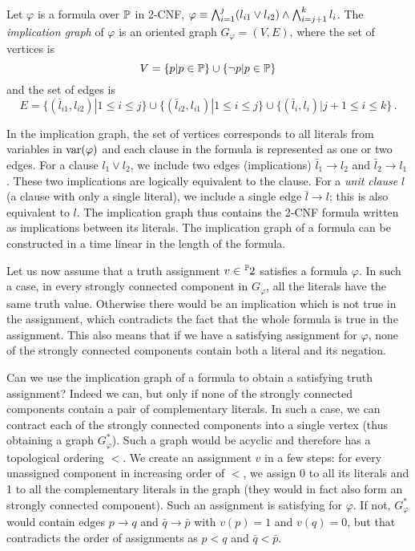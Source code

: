 \begin{definition}
Let $\varphi$ is a formula over $\mathbb{P}$ in 2-CNF, $\varphi \equiv \bigwedge_{i=1}^j (l_{i1} \lor l_{i2}) \land \bigwedge_{i=j+1}^k l_{i}$. The \emph{implication graph} of $\varphi$ is an oriented graph $G_\varphi = (V, E)$, where the set of vertices is $$V = \{p | p \in \mathbb{P}\} \cup \{\neg p | p \in \mathbb{P}\}$$ and the set of edges is $$E = \{(\bar{l}_{i1}, l_{i2}) | 1 \leq i \leq j\} \cup \{(\bar{l}_{i2}, l_{i1}) | 1 \leq i \leq j \} \cup \{(\bar{l}_i, l_i) | j + 1 \leq i \leq k\}\,.$$
\end{definition}

In the implication graph, the set of vertices corresponds to all literals from variables in $\operatorname{var}(\varphi)$ and each clause in the formula is represented as one or two edges. For a clause $l_1 \lor l_2$, we include two edges (implications) $\bar{l}_1 \to l_2$ and $\bar{l}_2 \to l_1$. These two implications are logically equivalent to the clause. For a \emph{unit clause} $l$ (a clause with only a single literal), we include a single edge $\bar{l} \to l$; this is also equivalent to $l$. The implication graph thus contains the 2-CNF formula written as implications between its literals. The implication graph of a formula can be constructed in a time linear in the length of the formula.

Let us now assume that a truth assignment $v \in \fset{\Prop}{2}$ satisfies a formula $\varphi$. In such a case, in every strongly connected component in $G_\varphi$, all the literals have the same truth value. Otherwise there would be an implication which is not true in the assignment, which contradicts the fact that the whole formula is true in the assignment. This also means that if we have a satisfying assignment for $\varphi$, none of the strongly connected components contain both a literal and its negation. 

Can we use the implication graph of a formula to obtain a satisfying truth assignment? Indeed we can, but only if none of the strongly connected components contain a pair of complementary literals. In such a case, we can contract each of the strongly connected components into a single vertex (thus obtaining a graph $G_\varphi^*$). Such a graph would be acyclic and therefore has a topological ordering $<$. We create an assignment $v$ in a few steps: for every unassigned component in increasing order of $<$, we assign 0 to all its literals and 1 to all the complementary literals in the graph (they would in fact also form an strongly connected component). Such an assignment is satisfying for $\varphi$. If not, $G_\varphi^*$ would contain edges $p \to q$ and $\bar{q}\to\bar{p}$ with $v(p) = 1$ and $v(q) = 0$, but that contradicts the order of assignments as $p < q$ and $\bar{q} < \bar{p}$.

